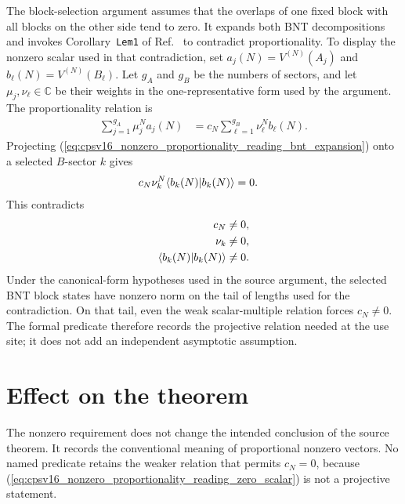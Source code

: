 \documentclass{article}
\begin{document}
The block-selection argument assumes that the overlaps of one fixed block with
all blocks on the other side tend to zero. It expands both BNT decompositions
and invokes Corollary~\texttt{Lem1} of
Ref.~\cite{Cirac2016MPDO_arXiv} to contradict proportionality. To display the
nonzero scalar used in that contradiction, set
$a_j(N)=V^{(N)}(A_j)$ and $b_\ell(N)=V^{(N)}(B_\ell)$. Let $g_A$ and $g_B$ be
the numbers of sectors, and let $\mu_j,\nu_\ell\in\mathbb C$ be their weights
in the one-representative form used by the argument. The proportionality
relation is
\begin{align}
    \sum_{j=1}^{g_A}\mu_j^N a_j(N)
        &=c_N\sum_{\ell=1}^{g_B}\nu_\ell^N b_\ell(N).
    \label{eq:cpsv16_nonzero_proportionality_reading_bnt_expansion}
\end{align}
Projecting
(\ref{eq:cpsv16_nonzero_proportionality_reading_bnt_expansion}) onto a selected
$B$-sector $k$ gives
\begin{align}
    c_N\nu_k^N\langle b_k(N) | b_k(N) \rangle
        &=0.
    \label{eq:cpsv16_nonzero_proportionality_reading_projected_sector}
\end{align}
This contradicts
\begin{align}
    c_N&\neq 0,
    \label{eq:cpsv16_nonzero_proportionality_reading_nonzero_scalar}\\
    \nu_k&\neq 0,
    \label{eq:cpsv16_nonzero_proportionality_reading_nonzero_weight}\\
    \langle b_k(N) | b_k(N) \rangle&\neq 0.
    \label{eq:cpsv16_nonzero_proportionality_reading_nonzero_norm}
\end{align}
Under the canonical-form hypotheses used in the source argument, the selected
BNT block states have nonzero norm on the tail of lengths used for the
contradiction. On that tail, even the weak scalar-multiple relation forces
$c_N\neq 0$. The formal predicate therefore records the projective relation
needed at the use site; it does not add an independent asymptotic assumption.

\section{Effect on the theorem}

The nonzero requirement does not change the intended conclusion of the source
theorem. It records the conventional meaning of proportional nonzero vectors.
No named predicate retains the weaker relation that permits $c_N=0$, because
(\ref{eq:cpsv16_nonzero_proportionality_reading_zero_scalar}) is not a
projective statement.
\end{document}
